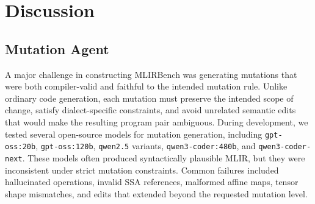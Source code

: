\documentclass[sigplan,screen,review,anonymous]{acmart}
\begin{document}




\section{Discussion}

\subsection{Mutation Agent}

A major challenge in constructing MLIRBench was generating mutations that were both compiler-valid and faithful to the intended mutation rule. Unlike ordinary code generation, each mutation must preserve the intended scope of change, satisfy dialect-specific constraints, and avoid unrelated semantic edits that would make the resulting program pair ambiguous. During development, we tested several open-source models for mutation generation, including \texttt{gpt-oss:20b}, \texttt{gpt-oss:120b}, \texttt{qwen2.5} variants, \texttt{qwen3-coder:480b}, and \texttt{qwen3-coder-next}. These models often produced syntactically plausible MLIR, but they were inconsistent under strict mutation constraints. Common failures included hallucinated operations, invalid SSA references, malformed affine maps, tensor shape mismatches, and edits that extended beyond the requested mutation level.
\end{document}
